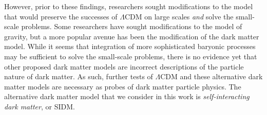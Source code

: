 However, prior to these findings, researchers sought modifications to the
model that would preserve the successes of \(\Lambda\)CDM on large scales
\emph{and} solve the small-scale problems. Some researchers have sought
modifications to the model of gravity, but a more popular avenue has been the
modification of the dark matter model. While it seems that integration of more
sophisticated baryonic processes may be sufficient to solve the small-scale
problems, there is no evidence yet that other proposed dark matter models are
incorrect descriptions of the particle nature of dark matter. As such, further
tests of \(\Lambda\)CDM and these alternative dark matter models are necessary
as probes of dark matter particle physics. The alternative dark matter model
that we consider in this work is \emph{self-interacting dark matter}, or SIDM.

